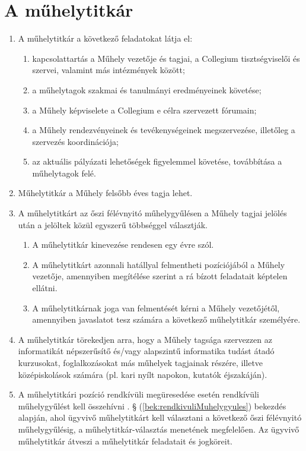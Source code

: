 \documentclass{../styles/rulebook}
\begin{document}
\section{A műhelytitkár}

\begin{enumerate}
	\item A műhelytitkár a következő feladatokat látja el:
	\begin{enumerate}
		\item kapcsolattartás a Műhely vezetője és tagjai, a Collegium tisztségviselői és szervei, valamint más intézmények között;
		\item a műhelytagok szakmai és tanulmányi eredményeinek követése;
		\item a Műhely képviselete a Collegium e célra szervezett fórumain;
		\item a Műhely rendezvényeinek és tevékenységeinek megszervezése, illetőleg a szervezés koordinációja;
		\item az aktuális pályázati lehetőségek figyelemmel követése, továbbítása a műhelytagok felé.
	\end{enumerate}
	\item Műhelytitkár a Műhely felsőbb éves tagja lehet.
	\item A műhelytitkárt az őszi félévnyitó műhelygyűlésen a Műhely tagjai jelölés után a jelöltek közül egyszerű többséggel választják.
	\begin{enumerate}
		\item A műhelytitkár kinevezése rendesen egy évre szól.
		\item A műhelytitkárt azonnali hatállyal felmentheti pozíciójából a Műhely vezetője, amennyiben megítélése szerint a rá bízott feladatait képtelen ellátni.
		\item A műhelytitkárnak joga van felmentését kérni a Műhely vezetőjétől, amennyiben javaslatot tesz számára a következő műhelytitkár személyére.
	\end{enumerate}
	\item A műhelytitkár törekedjen arra, hogy a Műhely tagsága szervezzen az informatikát népszerűsítő és/vagy alapszintű informatika tudást átadó kurzusokat, foglalkozásokat más műhelyek tagjainak részére, illetve középiskolások számára (pl. kari nyílt napokon, kutatók éjszakáján).
	\item A műhelytitkári pozíció rendkívüli megüresedése esetén rendkívüli műhelygyűlést kell összehívni . § (\ref{bek:rendkivuliMuhelygyules}) bekezdés alapján, ahol ügyvivő műhelytitkárt kell választani a következő őszi félévnyitó műhelygyűlésig, a műhelytitkár-választás menetének megfelelően. Az ügyvivő műhelytitkár átveszi a műhelytitkár feladatait és jogköreit.

\end{enumerate}
\end{document}

